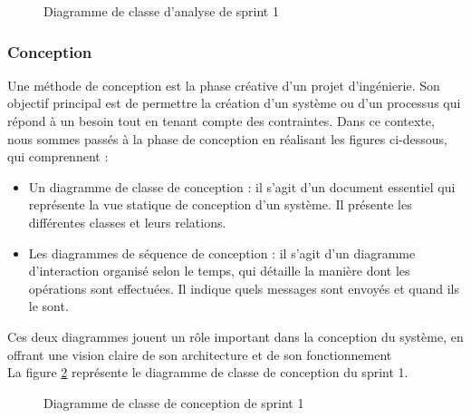 \setlength{\parskip}{1em}
\setlength{\parindent}{0em}



\begin{figure}[H]
  \centering
  \caption{Diagramme de classe d'analyse de sprint 1}
  \label{fig:class_analyse_auth}
\end{figure}


\subsubsection{Conception}


Une méthode de conception est la phase créative d'un projet d'ingénierie. Son objectif principal est de permettre la création d'un système ou d'un processus qui répond à un besoin tout en tenant compte des contraintes. Dans ce contexte, nous sommes passés à la phase de conception en réalisant les figures ci-dessous, qui comprennent :
\begin{itemize}
  
  \item Un diagramme de classe de conception : il s'agit d'un document essentiel qui représente la vue statique de conception d'un système. Il présente les différentes classes et leurs relations.\cite{classConception}
  \item Les diagrammes de séquence de conception : il s'agit d'un diagramme d'interaction organisé selon le temps, qui détaille la manière dont les opérations sont effectuées. Il indique quels messages sont envoyés et quand ils le sont. \cite{sequenceConception}
\end{itemize}

Ces deux diagrammes jouent un rôle important dans la conception du système, en offrant une vision claire de son architecture et de son fonctionnement\\

La figure \ref{fig:class_diagram_auth} représente le diagramme de classe de conception du sprint 1.

\begin{figure}[H]
  \centering
  \caption{Diagramme de classe de conception de sprint 1}
  \label{fig:class_diagram_auth}
\end{figure}


